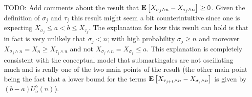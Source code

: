TODO: Add comments about the result that $\textbf{E}\left[X_{\sigma_j
    \wedge n} - X_{\tau_j    \wedge n} \right]\geq 0$.  Given the definition
of $\sigma_j$ and $\tau_j$ this result might seem a bit
counterintuitive since one is expecting $X_{\sigma_j} \leq a < b \leq X_{\tau_j}$.  The explanation for how this result can hold is
that in fact is very unlikely that $\sigma_j < n$; with high
probability $\sigma_j \geq n$ and moreover $X_{\sigma_j    \wedge n} = X_n \geq
X_{\tau_j \wedge n}$ and not $X_{\sigma_j    \wedge n} = X_{\sigma_j}
\leq a$.  This explanation is completely consistent with
the conceptual model that submartingales are not oscillating much and
is really one of the two main points of the result (the other main point
being the fact that a lower bound for the terms
$\textbf{E}\left[X_{\tau_{j+1} \wedge n} - X_{\sigma_j   \wedge n}\right]$ is given by $(b-a) U_a^b(n)$).


